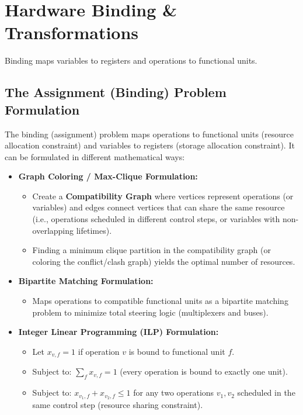 \documentclass[12pt,a4paper]{article}
\begin{document}
\section{Hardware Binding \& Transformations}

Binding maps variables to registers and operations to functional units.

\subsection{The Assignment (Binding) Problem Formulation}
The binding (assignment) problem maps operations to functional units (resource allocation constraint) and variables to registers (storage allocation constraint). It can be formulated in different mathematical ways:
\begin{itemize}[leftmargin=*, itemsep=4pt]
  \item \textbf{Graph Coloring / Max-Clique Formulation:}
        \begin{itemize}[leftmargin=*, label=$\bullet$, itemsep=2pt]
          \item Create a \textbf{Compatibility Graph} where vertices represent operations (or variables) and edges connect vertices that can share the same resource (i.e., operations scheduled in different control steps, or variables with non-overlapping lifetimes).
          \item Finding a minimum clique partition in the compatibility graph (or coloring the conflict/clash graph) yields the optimal number of resources.
        \end{itemize}
  \item \textbf{Bipartite Matching Formulation:}
        \begin{itemize}[leftmargin=*, label=$\bullet$, itemsep=2pt]
          \item Maps operations to compatible functional units as a bipartite matching problem to minimize total steering logic (multiplexers and buses).
        \end{itemize}
  \item \textbf{Integer Linear Programming (ILP) Formulation:}
        \begin{itemize}[leftmargin=*, label=$\bullet$, itemsep=2pt]
          \item Let $x_{v,f} = 1$ if operation $v$ is bound to functional unit $f$.
          \item Subject to: $\sum_{f} x_{v,f} = 1$ (every operation is bound to exactly one unit).
          \item Subject to: $x_{v_1,f} + x_{v_2,f} \le 1$ for any two operations $v_1, v_2$ scheduled in the same control step (resource sharing constraint).
        \end{itemize}
\end{itemize}
\end{document}
